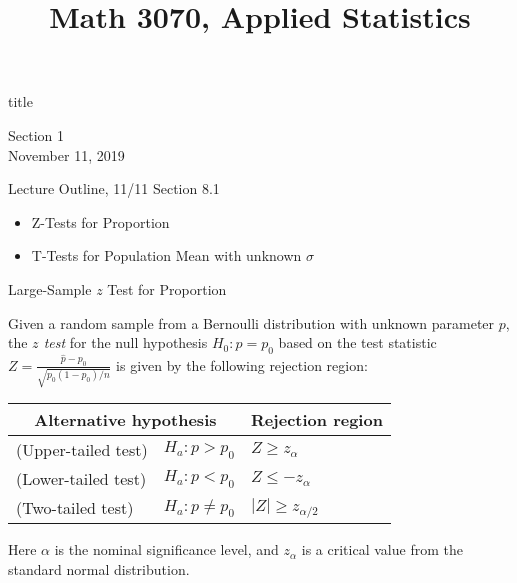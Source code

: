 \documentclass[t,handout]{beamer}
\title{Math 3070, Applied Statistics}
\newcommand{\nl}[1]{\vspace{#1 em}}
\begin{document}
\begin{frame}[c]
    \begin{beamercolorbox}[rounded=true,wd=\textwidth,center]{title}
        \inserttitle
    \end{beamercolorbox}
    \begin{center}
        Section 1\\
        \nl{0.5}
        November 11, 2019
    \end{center}
\end{frame}
\begin{frame}[c]{Lecture Outline, 11/11}
    Section 8.1
    \begin{itemize}
        \item Z-Tests for Proportion
        \item T-Tests for Population Mean with unknown $\sigma$
    \end{itemize}
\end{frame}

\begin{frame}{Large-Sample $z$ Test for Proportion}
    \begin{block}{}
        Given a random sample from a Bernoulli distribution with unknown parameter $p$, the \emph{$z$ test} for the null hypothesis $H_0: p=p_0$ based on the test statistic $Z=\frac{\hat p-p_0}{\sqrt{p_0(1-p_0)/n}}$ is given by the following rejection region:
        \begin{center}
            \begin{tabular}{ll|l}
                \multicolumn{2}{c}{Alternative hypothesis} & Rejection region                          \\ \hline
                (Upper-tailed test)                        & $H_a: p>p_0$     & $Z\geq z_{\alpha}$     \\
                (Lower-tailed test)                        & $H_a: p<p_0$     & $Z\leq -z_{\alpha}$    \\
                (Two-tailed test)                          & $H_a: p\neq p_0$ & $|Z|\geq z_{\alpha/2}$ \\
            \end{tabular}
        \end{center}
        Here $\alpha$ is the nominal significance level, and $z_{\alpha}$ is a critical value from the standard normal distribution.
    \end{block}
\end{frame}
\end{document}
